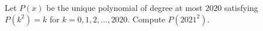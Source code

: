 Let $P(x)$ be the unique polynomial of degree at most $2020$ satisfying $P(k^2)=k$ for $k=0,1,2,\dots,2020$. Compute $P(2021^2)$.

